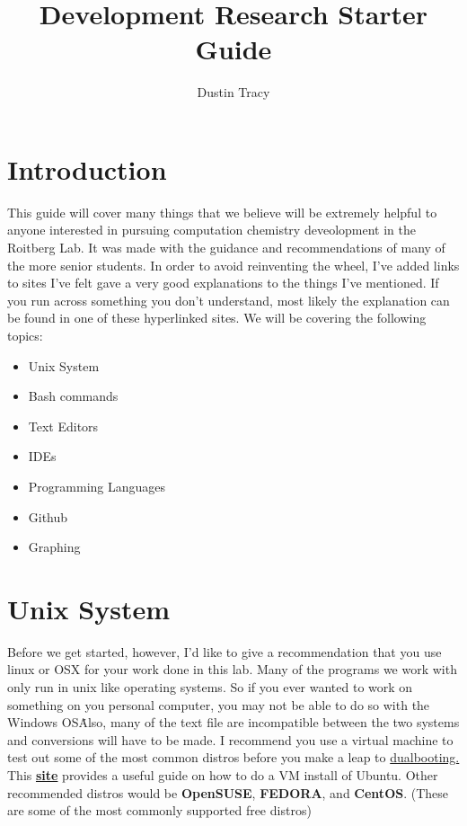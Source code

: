 \documentclass{article}
\begin{document}
\title{Development Research Starter Guide}
\author{Dustin Tracy}
\maketitle

\section*{Introduction}

This guide will cover many things that we believe will be extremely helpful to anyone interested in pursuing computation chemistry deveolopment in the Roitberg Lab. 
It was made with the guidance and recommendations of many of the more senior students. 
In order to avoid reinventing the wheel, I've added links to sites I've felt gave a very good explanations to the things I've mentioned.
If you run across something you don't understand, most likely the explanation can be found in one of these hyperlinked sites.
We will be covering the following topics: \\

\begin{itemize}
\item Unix System
\item Bash commands
\item Text Editors
\item IDEs
\item Programming Languages
\item Github
\item Graphing
\end{itemize}

\section*{Unix System}
Before we get started, however, I'd like to give a recommendation that you use linux or OSX for your work done in this lab. 
Many of the programs we work with only run in unix like operating systems.
So if you ever wanted to work on something on you personal computer, you may not be able to do so with the Windows OS\. 
Also, many of the text file are incompatible between the two systems and conversions will have to be made.
I recommend you use a virtual machine to test out some of the most common distros before you make a leap to \href{https://help.ubuntu.com/community/WindowsDualBoot}{dualbooting.}
This \href{http://henricasanova.github.io/VirtualBoxUbuntuHowTo.html}{\textbf{site}} provides a useful guide on how to do a VM install of Ubuntu.
Other recommended distros would be \textbf{OpenSUSE}, \textbf{FEDORA}, and \textbf{CentOS}. (These are some of the most commonly supported free distros)
\end{document}
